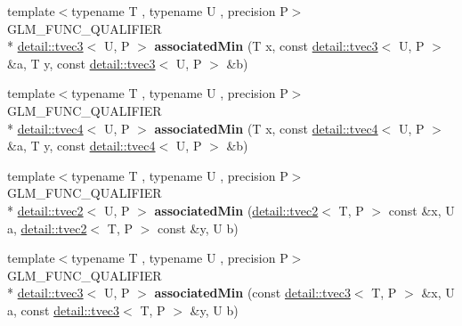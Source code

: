 \begin{DoxyCompactItemize}
\item 
\hypertarget{namespaceglm_a546b865980a6592d3b0223d74ee70907}{{\footnotesize template$<$typename T , typename U , precision P$>$ }\\G\-L\-M\-\_\-\-F\-U\-N\-C\-\_\-\-Q\-U\-A\-L\-I\-F\-I\-E\-R \\*
\hyperlink{structglm_1_1detail_1_1tvec3}{detail\-::tvec3}$<$ U, P $>$ {\bfseries associated\-Min} (T x, const \hyperlink{structglm_1_1detail_1_1tvec3}{detail\-::tvec3}$<$ U, P $>$ \&a, T y, const \hyperlink{structglm_1_1detail_1_1tvec3}{detail\-::tvec3}$<$ U, P $>$ \&b)}\label{namespaceglm_a546b865980a6592d3b0223d74ee70907}

\item 
\hypertarget{namespaceglm_a1276323c70c6a08d73089c1f3734d3a1}{{\footnotesize template$<$typename T , typename U , precision P$>$ }\\G\-L\-M\-\_\-\-F\-U\-N\-C\-\_\-\-Q\-U\-A\-L\-I\-F\-I\-E\-R \\*
\hyperlink{structglm_1_1detail_1_1tvec4}{detail\-::tvec4}$<$ U, P $>$ {\bfseries associated\-Min} (T x, const \hyperlink{structglm_1_1detail_1_1tvec4}{detail\-::tvec4}$<$ U, P $>$ \&a, T y, const \hyperlink{structglm_1_1detail_1_1tvec4}{detail\-::tvec4}$<$ U, P $>$ \&b)}\label{namespaceglm_a1276323c70c6a08d73089c1f3734d3a1}

\item 
\hypertarget{namespaceglm_a4e89b83acf8c80dc111e5152e8e52a75}{{\footnotesize template$<$typename T , typename U , precision P$>$ }\\G\-L\-M\-\_\-\-F\-U\-N\-C\-\_\-\-Q\-U\-A\-L\-I\-F\-I\-E\-R \\*
\hyperlink{structglm_1_1detail_1_1tvec2}{detail\-::tvec2}$<$ U, P $>$ {\bfseries associated\-Min} (\hyperlink{structglm_1_1detail_1_1tvec2}{detail\-::tvec2}$<$ T, P $>$ const \&x, U a, \hyperlink{structglm_1_1detail_1_1tvec2}{detail\-::tvec2}$<$ T, P $>$ const \&y, U b)}\label{namespaceglm_a4e89b83acf8c80dc111e5152e8e52a75}

\item 
\hypertarget{namespaceglm_ab8754d89ded0882c28671f13a66a11de}{{\footnotesize template$<$typename T , typename U , precision P$>$ }\\G\-L\-M\-\_\-\-F\-U\-N\-C\-\_\-\-Q\-U\-A\-L\-I\-F\-I\-E\-R \\*
\hyperlink{structglm_1_1detail_1_1tvec3}{detail\-::tvec3}$<$ U, P $>$ {\bfseries associated\-Min} (const \hyperlink{structglm_1_1detail_1_1tvec3}{detail\-::tvec3}$<$ T, P $>$ \&x, U a, const \hyperlink{structglm_1_1detail_1_1tvec3}{detail\-::tvec3}$<$ T, P $>$ \&y, U b)}\label{namespaceglm_ab8754d89ded0882c28671f13a66a11de}


\end{DoxyCompactItemize}
